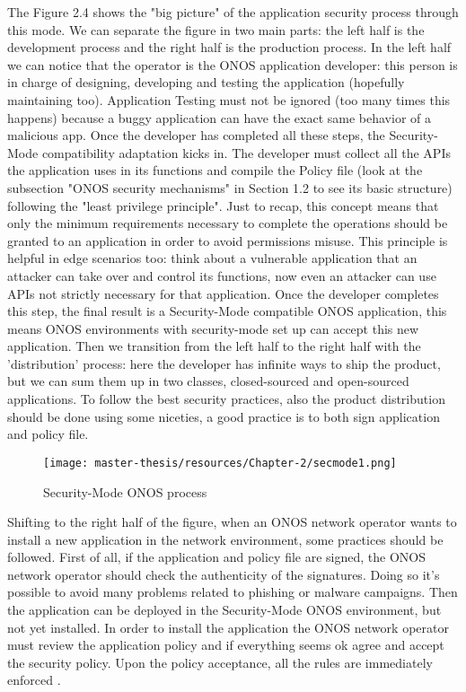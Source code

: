\documentclass[a4paper,10pt]{memoir}
\begin{document}
The Figure 2.4 shows the "big picture" of the application security process through this mode. We can separate the figure in two main parts: the left half is the development process and the right half is the production process. In the left half we can notice that the operator is the ONOS application developer: this person is in charge of designing, developing and testing the application (hopefully maintaining too). Application Testing must not be ignored (too many times this happens) because a buggy application can have the exact same behavior of a malicious app. Once the developer has completed all these steps, the Security-Mode compatibility adaptation kicks in. The developer must collect all the APIs the application uses in its functions and compile the Policy file (look at the subsection "ONOS security mechanisms" in Section 1.2 to see its basic structure) following the "least privilege principle". Just to recap, this concept means that only the minimum requirements necessary to complete the operations should be granted to an application in order to avoid permissions misuse. This principle is helpful in edge scenarios too: think about a vulnerable application that an attacker can take over and control its functions, now even an attacker can use APIs not strictly necessary for that application. Once the developer completes this step, the final result is a Security-Mode compatible ONOS application, this means ONOS environments with security-mode set up can accept this new application. Then we transition from the left half to the right half with the 'distribution' process: here the developer has infinite ways to ship the product, but we can sum them up in two classes, closed-sourced and open-sourced applications. To follow the best security practices, also the product distribution should be done using some niceties, a good practice is to both sign application and policy file.
\begin{figure}[h]
\caption{Security-Mode ONOS process}
\label{fig:secmode-process}
\texttt{[image: master-thesis/resources/Chapter-2/secmode1.png]}
\centering
\end{figure}
Shifting to the right half of the figure, when an ONOS network operator wants to install a new application in the network environment, some practices should be followed. First of all, if the application and policy file are signed, the ONOS network operator should check the authenticity of the signatures. Doing so it's possible to avoid many problems related to phishing or malware campaigns. Then the application can be deployed in the Security-Mode ONOS environment, but not yet installed. In order to install the application the ONOS network operator must review the application policy and if everything seems ok agree and accept the security policy. Upon the policy acceptance, all the rules are immediately enforced \cite{secmodeslides}. 
\end{document}
